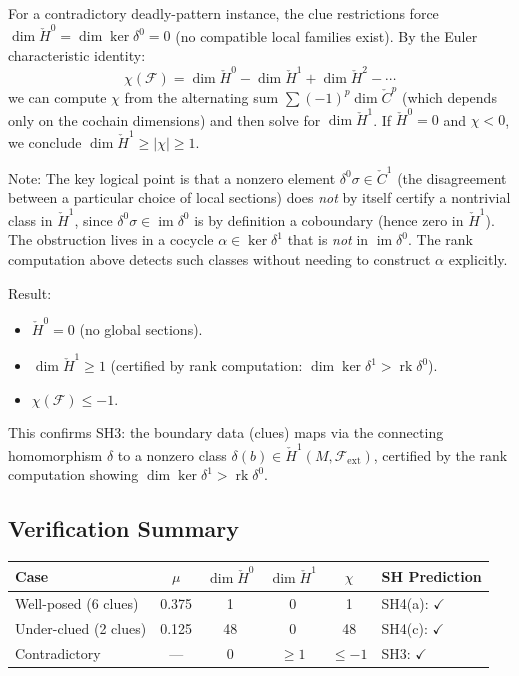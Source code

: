 \documentclass[11pt,letterpaper]{article}
\newcommand{\Cech}{\check{C}}
\newcommand{\Hcech}{\check{H}}
\newcommand{\sheaf}{\mathcal{F}}
\DeclareMathOperator{\im}{im}
\DeclareMathOperator{\rk}{rk}
\begin{document}
\medskip
For a contradictory deadly-pattern instance, the clue restrictions 
force $\dim \Hcech^0 = \dim \ker \delta^0 = 0$ (no compatible local 
families exist). By the Euler characteristic identity:
\begin{equation}\label{eq:chi_obstruction}
    \chi(\sheaf) = \dim \Hcech^0 - \dim \Hcech^1 + \dim \Hcech^2 
    - \cdots
\end{equation}
we can compute $\chi$ from the alternating sum $\sum (-1)^p 
\dim \Cech^p$ (which depends only on the cochain dimensions) and 
then solve for $\dim \Hcech^1$. If $\Hcech^0 = 0$ and $\chi < 0$, 
we conclude $\dim \Hcech^1 \geq |\chi| \geq 1$.

Note: The key logical point is that a nonzero element 
$\delta^0 \sigma \in \Cech^1$ (the disagreement between a particular 
choice of local sections) does \emph{not} by itself certify a 
nontrivial class in $\Hcech^1$, since $\delta^0 \sigma \in \im 
\delta^0$ is by definition a coboundary (hence zero in $\Hcech^1$). 
The obstruction lives in a cocycle $\alpha \in \ker \delta^1$ that 
is \emph{not} in $\im \delta^0$. The rank computation above detects 
such classes without needing to construct $\alpha$ explicitly.

Result:
\begin{itemize}
    \item $\Hcech^0 = 0$ (no global sections).
    \item $\dim \Hcech^1 \geq 1$ (certified by rank computation: 
    $\dim \ker \delta^1 > \rk \delta^0$).
    \item $\chi(\sheaf) \leq -1$.
\end{itemize}
This confirms SH3: the boundary data (clues) maps via the connecting 
homomorphism $\delta$ to a nonzero class 
$\delta(b) \in \Hcech^1(M, \sheaf_{\mathrm{ext}})$, certified by the 
rank computation showing $\dim \ker \delta^1 > \rk \delta^0$.

\subsection{Verification Summary}

\begin{center}
\renewcommand{\arraystretch}{1.3}
\begin{tabular}{lccccl}
\textbf{Case} & $\mu$ & $\dim \Hcech^0$ & $\dim \Hcech^1$ & 
$\chi$ & \textbf{SH Prediction} \\
\hline
Well-posed (6 clues) & 0.375 & 1 & 0 & 1 & SH4(a): $\checkmark$ \\
Under-clued (2 clues) & 0.125 & 48 & 0 & 48 & SH4(c): $\checkmark$ \\
Contradictory & --- & 0 & $\geq 1$ & $\leq -1$ & SH3: $\checkmark$ \\
\end{tabular}
\end{center}
\end{document}
